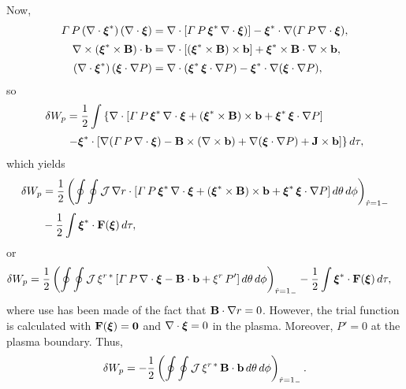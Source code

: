\documentclass[12pt,prb,aps,notitlepage]{revtex4-1}
\newcommand{\bxi}{\mbox{\boldmath$\xi$}}
\begin{document}
Now,
\begin{align}
{\mit\Gamma}\,P\,(\nabla\cdot\bxi^\ast)\,(\nabla\cdot\bxi)&=\nabla\cdot[{\mit\Gamma}\,P\,\bxi^\ast\,\nabla\cdot\bxi)]-\bxi^\ast\cdot\nabla(
{\mit\Gamma}\,P\,\nabla\cdot\bxi),\\[0.5ex]
 \nabla\times (\bxi^\ast\times {\bf B})\cdot {\bf b}&= \nabla\cdot[(\bxi^\ast\times {\bf B})\times {\bf b}] + \bxi^\ast\times {\bf B}\cdot\nabla\times {\bf b},\\[0.5ex]
 (\nabla\cdot\bxi^\ast)\,(\bxi\cdot\nabla P)&=\nabla\cdot(\bxi^\ast\,\bxi\cdot\nabla P) -\bxi^\ast\cdot\nabla(\bxi\cdot\nabla P),
\end{align}
so
\begin{align}
\delta W_p &= \frac{1}{2}\int\left\{\nabla\cdot[{\mit\Gamma}\,P\,\bxi^\ast\,\nabla\cdot\bxi+ (\bxi^\ast\times {\bf B})\times {\bf b}+\bxi^\ast\,\bxi\cdot\nabla P]\right.\nonumber\\[0.5ex]&\left.-\bxi^\ast\cdot[ \nabla({\mit\Gamma}\,P\,\nabla\cdot\bxi) - {\bf B}\times(\nabla\times {\bf b})+\nabla(\bxi\cdot\nabla P)+{\bf J}\times  {\bf b}]\right\}d\tau,
\end{align}
which yields
\begin{align}
\delta W_p &= \frac{1}{2}\left(\oint\oint{\cal J}\,\nabla r\cdot[{\mit\Gamma}\,P\,\bxi^\ast\,\nabla\cdot\bxi+ (\bxi^\ast\times {\bf B})\times {\bf b}+\bxi^\ast\,\bxi\cdot\nabla P]\,d\theta\,d\phi\right)_{\hat{r}=1-}\nonumber\\[0.5ex]
&-\frac{1}{2}\int\bxi^\ast\cdot{\bf F}(\bxi)\,d\tau,
\end{align}
or
\begin{align}
\delta W_p &= \frac{1}{2}\left(\oint\oint{\cal J}\,\xi^{r\,\ast}\,[{\mit\Gamma}\,P\,\nabla\cdot\bxi -{\bf B}\cdot{\bf b} + \xi^r\,P']\,d\theta\,d\phi\right)_{\hat{r}=1_{-}}-\frac{1}{2}\int\bxi^\ast\cdot{\bf F}(\bxi)\,d\tau,
\end{align}
where use has been made of the fact that ${\bf B}\cdot\nabla r = 0$. However, the trial function is calculated with ${\bf F}(\bxi)={\bf 0}$ and
$\nabla\cdot\bxi=0$  in the plasma. Moreover, $P'=0$ at the plasma boundary. Thus,
\begin{equation}
\delta W_p = -\frac{1}{2}\left(\oint\oint {\cal J}\,\xi^{r\,\ast}\,{\bf B}\cdot{\bf b}\,d\theta\,d\phi\right)_{\hat{r}=1_{-}}.
\end{equation}
\end{document}
